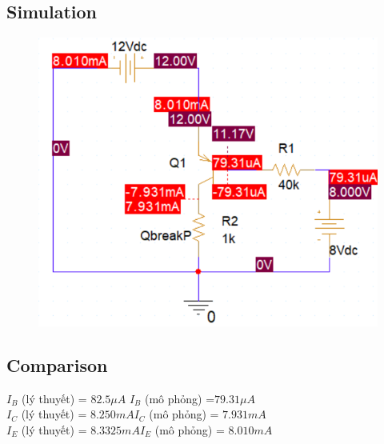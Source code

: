 \subsection{Simulation}
\begin{figure}[H]
    \centering
    \includegraphics[width=0.9\linewidth]{graphics/ex6/f2.png}
\end{figure}

\subsection{Comparison}
$I_B$ (lý thuyết) = \dotfill$82.5 \mu A$ \dotfill $I_B$ (mô phỏng) =\dotfill $79.31 \mu A$\dotfill\bigskip\\
$I_C$ (lý thuyết) = \dotfill$ 8.250 mA$\dotfill $I_C$ (mô phỏng) = \dotfill $7.931mA$\dotfill\bigskip\\
$I_E$ (lý thuyết) = \dotfill$8.3325 mA$\dotfill $I_E$ (mô phỏng) = \dotfill$8.010mA $\dotfill\bigskip\\
